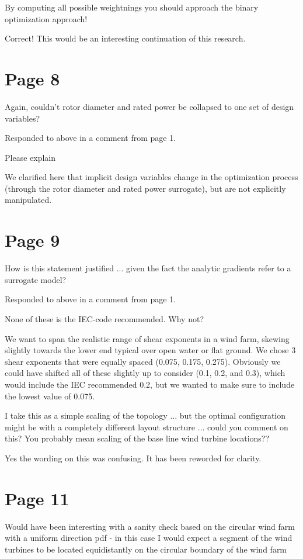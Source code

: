 \documentclass[12pt]{report}
\begin{document}
\bigskip \color{black}
By computing all possible weightnings you should approach the binary optimization approach!

\color{blue} Correct! This would be an interesting continuation of this research.

\bigskip \color{black}
\section*{Page 8}
\bigskip \color{black}
Again, couldn't rotor diameter and rated power be collapsed to one set of design variables?

\color{blue} Responded to above in a comment from page 1.

\bigskip \color{black}
Please explain

\color{blue} We clarified here that implicit design variables change in the optimization process (through the rotor diameter and rated power surrogate), but are not explicitly manipulated.

\bigskip \color{black}
\section*{Page 9}
\bigskip \color{black}
How is this statement justified ... given the fact the analytic gradients refer to a surrogate model?

\color{blue} Responded to above in a comment from page 1.

\bigskip \color{black}
None of these is the IEC-code recommended. Why not?

\color{blue} We want to span the realistic range of shear exponents in a wind farm, skewing slightly towards the lower end typical over open water or flat ground. We chose 3 shear exponents that were equally spaced (0.075, 0.175, 0.275). Obviously we could have shifted all of these slightly up to consider (0.1, 0.2, and 0.3), which would include the IEC recommended 0.2, but we wanted to make sure to include the lowest value of 0.075. 

\bigskip \color{black}
I take this as a simple scaling of the topology ... but the optimal configuration might be with a completely different layout structure ... could you comment on this? You probably mean scaling of the base line wind turbine locations??

\color{blue} Yes the wording on this was confusing. It has been reworded for clarity.

\bigskip \color{black}
\section*{Page 11}
\bigskip \color{black}
Would have been interesting with a sanity check based on the circular wind farm with a uniform direction pdf - in this case I would expect a segment of the wind turbines to be located equidistantly on the circular boundary of the wind farm
\end{document}
